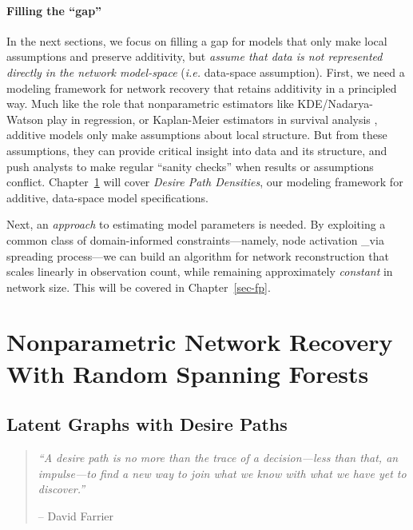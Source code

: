 \documentclass[%
	12pt,
		oneside,
		letterpaper
]{book}
\begin{document}
\subsection{Filling the ``gap''}\label{filling-the-gap}

In the next sections, we focus on filling a gap for models that only make local assumptions and preserve additivity, but \emph{assume that data is not represented directly in the network model-space} (\emph{i.e.} data-space assumption).
First, we need a modeling framework for network recovery that retains additivity in a principled way.
Much like the role that nonparametric estimators like KDE/Nadarya-Watson play in regression, or Kaplan-Meier estimators in survival analysis \autocite{Topicsadvancedeconometrics_Bierens1996,NonparametricEstimationIncomplete_Kaplan1958}, additive models only make assumptions about local structure.
But from these assumptions, they can provide critical insight into data and its structure, and push analysts to make regular ``sanity checks'' when results or assumptions conflict.
Chapter~\ref{sec-desirepath} will cover \emph{Desire Path Densities}, our modeling framework for additive, data-space model specifications.

Next, an \emph{approach} to estimating model parameters is needed.
By exploiting a common class of domain-informed constraints---namely, node activation \_via spreading process---we can build an algorithm for network reconstruction that scales linearly in observation count, while remaining approximately \emph{constant} in network size.
This will be covered in Chapter~\ref{sec-fp}.

\part{Nonparametric Network Recovery With Random Spanning Forests}

\chapter{Latent Graphs with Desire Paths}\label{sec-desirepath}

\begin{flushright}

\begin{minipage}{.7\linewidth}

\singlespacing

\begin{quote}
\emph{``A desire path is no more than the trace of a decision---less than that, an impulse---to find a new way to join what we know with what we have yet to discover.''}

\hfill -- David Farrier\\
\doublespacing
\end{quote}

\end{minipage}

\end{flushright}
\end{document}
